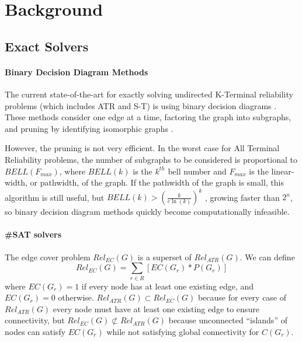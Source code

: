 \hypertarget{background}{%
\section{Background}\label{background}}

\hypertarget{exact-solvers}{%
\subsection{Exact Solvers}\label{exact-solvers}}

\hypertarget{binary-decision-diagram-methods}{%
\paragraph{\texorpdfstring{Binary Decision Diagram Methods\\
}{Binary Decision Diagram Methods }}\label{binary-decision-diagram-methods}}

The current state-of-the-art for exactly solving undirected K-Terminal reliability problems (which includes ATR and S-T) is using binary decision diagrams \cite{carlier1996decomposition}. These methods consider one edge at a time, factoring the graph into subgraphs, and pruning by identifying isomorphic graphs \cite{hardy2007k}.

However, the pruning is not very efficient. In the worst case for All Terminal Reliability problems, the number of subgraphs to be considered is proportional to \(BELL(F_{max})\), where \(BELL(k)\) is the \(k^{th}\) bell number and \(F_{max}\) is the linear-width, or pathwidth, of the graph. If the pathwidth of the graph is small, this algorithm is still useful, but \(BELL(k)>(\frac{k}{e\ln(k)})^k\) \cite{berend2010improved}, growing faster than \(2^n\), so binary decision diagram methods quickly become computationally infeasible.

\hypertarget{sat-solvers}{%
\paragraph{\texorpdfstring{\#SAT solvers\\
}{\#SAT solvers }}\label{sat-solvers}}

The edge cover problem \(Rel_{EC}(G)\) is a superset of \(Rel_{ATR}(G)\). We can define \[Rel_{EC}(G) = \sum_{r \in R} [EC(G_r)*P(G_r)]\] where \(EC(G_r)=1\) if every node has at least one existing edge, and \(EC(G_r)=0\) otherwise. \(Rel_{ATR}(G) \subset Rel_{EC}(G)\) because for every case of \(Rel_{ATR}(G)\) every node must have at least one existing edge to ensure connectivity, but \(Rel_{EC}(G) \not\subset Rel_{ATR}(G)\) because unconnected ``islands'' of nodes can satisfy \(EC(G_r)\) while not satisfying global connectivity for \(C(G_r)\).

